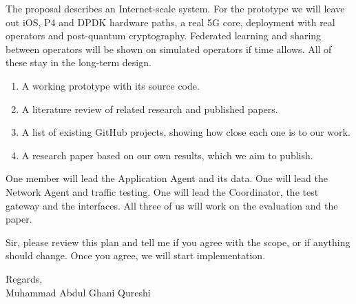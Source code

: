 \documentclass[10.5pt,a4paper]{article}
\newcommand{\head}[1]{\vspace{5pt}{\large\bfseries #1}\par\vspace{1pt}}
\begin{document}
\head{5. What stays out of the prototype}
The proposal describes an Internet-scale system. For the prototype we will leave out iOS, P4 and DPDK hardware paths, a real 5G core, deployment with real operators and post-quantum cryptography. Federated learning and sharing between operators will be shown on simulated operators if time allows. All of these stay in the long-term design.

\head{6. What we will deliver}
\begin{enumerate}
  \item A working prototype with its source code.
  \item A literature review of related research and published papers.
  \item A list of existing GitHub projects, showing how close each one is to our work.
  \item A research paper based on our own results, which we aim to publish.
\end{enumerate}

\head{7. How we will divide the work}
One member will lead the Application Agent and its data. One will lead the Network Agent and traffic testing. One will lead the Coordinator, the test gateway and the interfaces. All three of us will work on the evaluation and the paper.

\head{8. What I need from you}
Sir, please review this plan and tell me if you agree with the scope, or if anything should change. Once you agree, we will start implementation.

\vspace{5pt}
Regards,\\
Muhammad Abdul Ghani Qureshi
\end{document}

